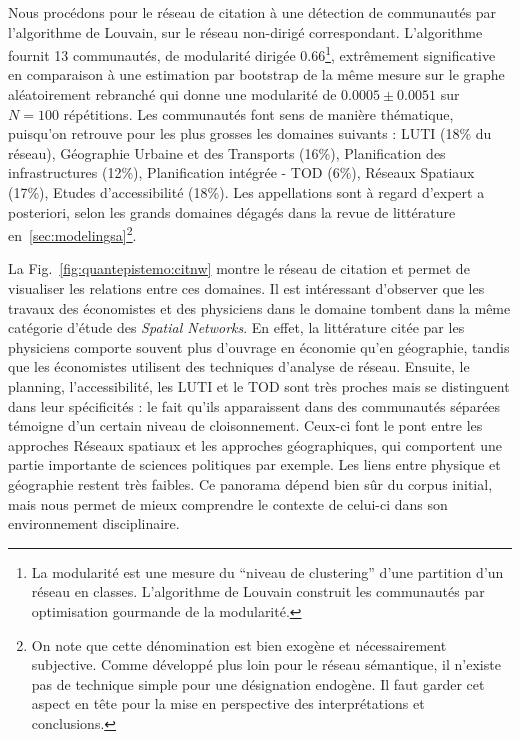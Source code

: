 Nous procédons pour le réseau de citation à une détection de communautés par l'algorithme de Louvain, sur le réseau non-dirigé correspondant. L'algorithme fournit 13 communautés, de modularité dirigée 0.66\footnote{La modularité est une mesure du ``niveau de clustering'' d'une partition d'un réseau en classes. L'algorithme de Louvain construit les communautés par optimisation gourmande de la modularité.}, extrêmement significative en comparaison à une estimation par bootstrap de la même mesure sur le graphe aléatoirement rebranché qui donne une modularité de $0.0005 \pm 0.0051$ sur $N=100$ répétitions. Les communautés font sens de manière thématique, puisqu'on retrouve pour les plus grosses les domaines suivants : LUTI (18\% du réseau), Géographie Urbaine et des Transports (16\%), Planification des infrastructures (12\%), Planification intégrée - TOD (6\%), Réseaux Spatiaux (17\%), Etudes d'accessibilité (18\%). Les appellations sont à regard d'expert a posteriori, selon les grands domaines dégagés dans la revue de littérature en~\ref{sec:modelingsa}\footnote{On note que cette dénomination est bien exogène et nécessairement subjective. Comme développé plus loin pour le réseau sémantique, il n'existe pas de technique simple pour une désignation endogène. Il faut garder cet aspect en tête pour la mise en perspective des interprétations et conclusions.}.


La Fig.~\ref{fig:quantepistemo:citnw} montre le réseau de citation et permet de visualiser les relations entre ces domaines. Il est intéressant d'observer que les travaux des économistes et des physiciens dans le domaine tombent dans la même catégorie d'étude des \emph{Spatial Networks}. En effet, la littérature citée par les physiciens comporte souvent plus d'ouvrage en économie qu'en géographie, tandis que les économistes utilisent des techniques d'analyse de réseau. Ensuite, le planning, l'accessibilité, les LUTI et le TOD sont très proches mais se distinguent dans leur spécificités : le fait qu'ils apparaissent dans des communautés séparées témoigne d'un certain niveau de cloisonnement. Ceux-ci font le pont entre les approches Réseaux spatiaux et les approches géographiques, qui comportent une partie importante de sciences politiques par exemple. Les liens entre physique et géographie restent très faibles. Ce panorama dépend bien sûr du corpus initial, mais nous permet de mieux comprendre le contexte de celui-ci dans son environnement disciplinaire.


